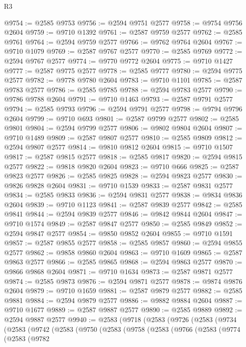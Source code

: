 \begin{lexlean}{R3}
\begin{coremodule}
@9754 := @2585 @9753
@9756 := @2594 @9751 @2577
@9758 := @9754 @9756 @2604
@9759 := @9710 @1392
@9761 := @2587 @9759 @2577
@9762 := @2585 @9761
@9764 := @2594 @9759 @2577
@9766 := @9762 @9764 @2604
@9767 := @9710 @1079
@9769 := @2587 @9767 @2577
@9770 := @2585 @9769
@9772 := @2594 @9767 @2577
@9774 := @9770 @9772 @2604
@9775 := @9710 @1427
@9777 := @2587 @9775 @2577
@9778 := @2585 @9777
@9780 := @2594 @9775 @2577
@9782 := @9778 @9780 @2604
@9783 := @9710 @1101
@9785 := @2587 @9783 @2577
@9786 := @2585 @9785
@9788 := @2594 @9783 @2577
@9790 := @9786 @9788 @2604
@9791 := @9710 @1463
@9793 := @2587 @9791 @2577
@9794 := @2585 @9793
@9796 := @2594 @9791 @2577
@9798 := @9794 @9796 @2604
@9799 := @9710 @693
@9801 := @2587 @9799 @2577
@9802 := @2585 @9801
@9804 := @2594 @9799 @2577
@9806 := @9802 @9804 @2604
@9807 := @9710 @1489
@9809 := @2587 @9807 @2577
@9810 := @2585 @9809
@9812 := @2594 @9807 @2577
@9814 := @9810 @9812 @2604
@9815 := @9710 @1507
@9817 := @2587 @9815 @2577
@9818 := @2585 @9817
@9820 := @2594 @9815 @2577
@9822 := @9818 @9820 @2604
@9823 := @9710 @666
@9825 := @2587 @9823 @2577
@9826 := @2585 @9825
@9828 := @2594 @9823 @2577
@9830 := @9826 @9828 @2604
@9831 := @9710 @1539
@9833 := @2587 @9831 @2577
@9834 := @2585 @9833
@9836 := @2594 @9831 @2577
@9838 := @9834 @9836 @2604
@9839 := @9710 @1123
@9841 := @2587 @9839 @2577
@9842 := @2585 @9841
@9844 := @2594 @9839 @2577
@9846 := @9842 @9844 @2604
@9847 := @9710 @1574
@9849 := @2587 @9847 @2577
@9850 := @2585 @9849
@9852 := @2594 @9847 @2577
@9854 := @9850 @9852 @2604
@9855 := @9710 @1591
@9857 := @2587 @9855 @2577
@9858 := @2585 @9857
@9860 := @2594 @9855 @2577
@9862 := @9858 @9860 @2604
@9863 := @9710 @1609
@9865 := @2587 @9863 @2577
@9866 := @2585 @9865
@9868 := @2594 @9863 @2577
@9870 := @9866 @9868 @2604
@9871 := @9710 @1634
@9873 := @2587 @9871 @2577
@9874 := @2585 @9873
@9876 := @2594 @9871 @2577
@9878 := @9874 @9876 @2604
@9879 := @9710 @1659
@9881 := @2587 @9879 @2577
@9882 := @2585 @9881
@9884 := @2594 @9879 @2577
@9886 := @9882 @9884 @2604
@9887 := @9710 @1677
@9889 := @2587 @9887 @2577
@9890 := @2585 @9889
@9892 := @2594 @9887 @2577
@9940 := @2583
    (@9718
      (@2583
        (@9726
          (@2583
            (@9734
              (@2583
                (@9742
                  (@2583
                    (@9750
                      (@2583
                        (@9758
                          (@2583
                            (@9766
                              (@2583
                                (@9774
                                  (@2583
                                    (@9782

\end{coremodule}
\end{lexlean}
